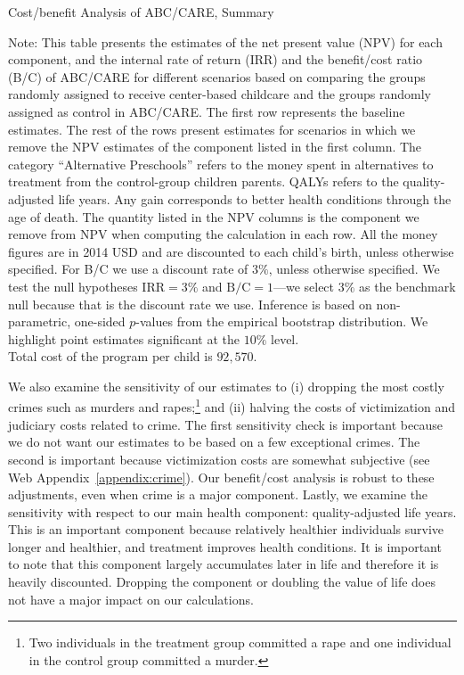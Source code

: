 \begin{table}[H]
\centering
\caption{Cost/benefit Analysis of ABC/CARE, Summary}\label{table:cba}
\begin{threeparttable}
\tiny

\begin{tablenotes}
\footnotesize
\item Note: This table presents the estimates of the net present value (NPV) for each component, and the internal rate of return (IRR) and the benefit/cost ratio (B/C) of ABC/CARE for different scenarios based on comparing the groups randomly assigned to receive center-based childcare and the groups randomly assigned as control in ABC/CARE. The first row represents the baseline estimates. The rest of the rows present estimates for scenarios in which we remove the NPV estimates of the component listed in the first column. The category ``Alternative Preschools'' refers to the money spent in alternatives to treatment from the control-group children parents. QALYs refers to the quality-adjusted life years. Any gain corresponds to better health conditions through the age of death. The quantity listed in the NPV columns is the component we remove from NPV when computing the calculation in each row. All the money figures are in 2014 USD and are discounted to each child's birth, unless otherwise specified. For B/C we use a discount rate of $3\%$, unless otherwise specified. We test the null hypotheses $\text{IRR} = 3\%$ and $\text{B/C} = 1$---we select $3\%$ as the benchmark null because that is the discount rate we use. Inference is based on non-parametric, one-sided $p$-values from the empirical bootstrap distribution. We highlight point estimates significant at the $10\%$ level.\\
    Total cost of the program per child is $92,570$.
\end{tablenotes}
\end{threeparttable}
\end{table}

We also examine the sensitivity of our estimates to (i) dropping the most costly crimes such as murders and rapes;\footnote{Two individuals in the treatment group committed a rape and one individual in the control group committed a murder.} and (ii) halving the costs of victimization and judiciary costs related to crime. The first sensitivity check is important because we do not want our estimates to be based on a few exceptional crimes. The second is important because victimization costs are somewhat subjective (see Web Appendix~\ref{appendix:crime}). Our benefit/cost analysis is robust to these adjustments, even when crime is a major component. Lastly, we examine the sensitivity with respect to our main health component: quality-adjusted life years. This is an important component because relatively healthier individuals survive longer and healthier, and treatment improves health conditions. It is important to note that this component largely accumulates later in life and therefore it is heavily discounted. Dropping the component or doubling the value of life does not have a major impact on our calculations.

